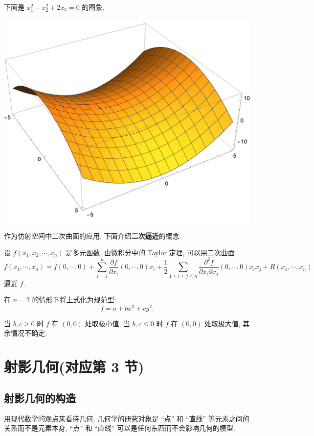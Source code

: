 \documentclass{ctexart}
\begin{document}
下面是 $x_1^2-x_2^2+2x_3=0$ 的图象.
\begin{center}
    \includegraphics[scale=.5]{materials/4.png}
\end{center}
作为仿射空间中二次曲面的应用, 下面介绍\textbf{二次逼近}的概念.
\begin{example}
    设 $f(x_1,x_2,\cdots,x_n)$ 是多元函数, 由微积分中的 Taylor 定理, 可以用二次曲面
    \[f(x_1,\cdots,x_n)=f(0,\cdots,0)+\sum\limits_{i=1}^n\dfrac{\partial f}{\partial x_i}(0,\cdots,0)x_i+\dfrac{1}{2}\sum\limits_{1\leq i\leq j\leq n}\dfrac{\partial^2f}{\partial x_i\partial x_j}(0,\cdots,0)x_ix_j+R(x_1,\cdots,x_n)\]
    逼近 $f$.

    在 $n=2$ 的情形下将上式化为规范型:
    \[f=a+bx^2+cy^2.\]

    当 $b,c\geq0$ 时 $f$ 在 $(0,0)$ 处取极小值, 当 $b,c\leq0$ 时 $f$ 在 $(0,0)$ 处取极大值, 其余情况不确定.
\end{example}
\section{射影几何(对应第 3 节)}
\subsection{射影几何的构造}
用现代数学的观点来看待几何, 几何学的研究对象是 ``点'' 和 ``直线'' 等元素之间的关系而不是元素本身, ``点'' 和 ``直线'' 可以是任何东西而不会影响几何的模型.
\end{document}
